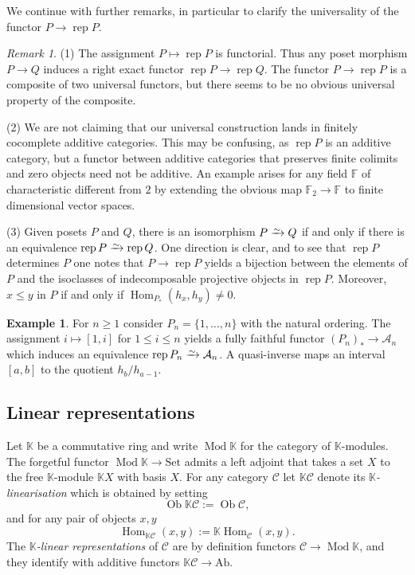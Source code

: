 \documentclass[a4paper]{amsart}
\theoremstyle{plain}
\theoremstyle{definition}
\newtheorem{exm}[thm]{Example}
\theoremstyle{remark}
\newtheorem{rem}[thm]{Remark}
\numberwithin{equation}{section}
\newcommand{\Hom}{\operatorname{Hom}}
\newcommand{\Mod}{\operatorname{Mod}}
\newcommand{\Ob}{\operatorname{Ob}}
\newcommand{\rep}{\operatorname{rep}}
\newcommand{\Ab}{\mathrm{Ab}}
\newcommand{\Set}{\mathrm{Set}}
\newcommand{\iso}{\xrightarrow{\raisebox{-.4ex}[0ex][0ex]{$\scriptstyle{\sim}$}}}
\def\A{\mathcal A}
\def\C{\mathcal C}
\def\bbF{\mathbb F}
\def\bbK{\mathbb K}
\begin{document}
We continue with further remarks, in particular to clarify the
universality of the functor $P\to \rep P$.

\begin{rem}
(1) The assignment $P\mapsto \rep P$ is functorial. Thus any poset morphism
$P\to Q$ induces a right exact functor $\rep P\to\rep Q$. The functor
$P\to \rep P$ is a composite of two universal functors, but there
seems to be no obvious universal property of the composite.

(2) We are not claiming that our universal construction lands in
finitely cocomplete additive categories. This may be confusing, as
$\rep P$ is an additive category, but a functor between additive
categories that preserves finite colimits and zero objects need not be
additive. An example arises for any field $\bbF$ of characteristic
different from $2$ by extending the obvious map $\bbF_2\to\bbF$ to
finite dimensional vector spaces.

(3) Given posets $P$ and $Q$, there is an isomorphism $P\iso Q$ if and
only if there is an equivalence $\rep P\iso\rep Q$. One direction is
clear, and to see that $\rep P$ determines $P$ one notes that
$P\to\rep P$ yields a bijection between the elements of $P$ and the
isoclasses of indecomposable projective objects in $\rep P$. Moreover,
$x\le y$ in $P$ if and only if $\Hom_{P_*}(h_x,h_y)\neq 0$.
\end{rem}

\begin{exm}
  For $n\ge 1$ consider $P_n=\{1,\ldots,n\}$ with the natural
  ordering. The assignment $i\mapsto [1,i]$ for $1\le i\le n$ yields a
  fully faithful functor $(P_n)_*\to\A_n$ which induces an equivalence
  $\rep P_n\iso \A_n$. A quasi-inverse maps an interval $[a,b]$ to the
  quotient $h_b/h_{a-1}$.
\end{exm}

\subsection*{Linear representations}

Let $\bbK$ be a commutative ring and write $\Mod\bbK$ for the category
of $\bbK$-modules. The forgetful functor $\Mod\bbK\to \Set$ admits a
left adjoint that takes a set $X$ to the free $\bbK$-module $\bbK X$
with basis $X$. For any category $\C$ let $\bbK\C$
denote its \emph{$\bbK$-linearisation} which is obtained by setting
\[\Ob\bbK\C:=\Ob\C,\]
and for any pair of objects $x,y$
\[\Hom_{\bbK\C}(x,y):=\bbK\Hom_\C(x,y).\] 
The \emph{$\bbK$-linear representations} of $\C$ are by definition
functors $\C\to\Mod\bbK$, and they identify with additive
functors $\bbK\C\to\Ab$.
\end{document}
